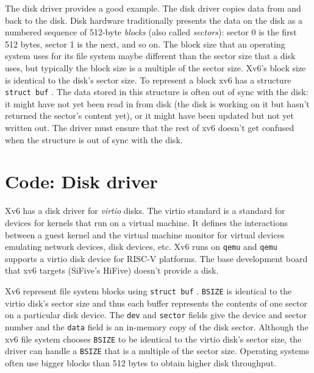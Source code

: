 The disk driver provides a good example.  The disk driver copies data
from and back to the disk.  Disk hardware traditionally presents the data on the
disk as a numbered sequence of 512-byte 
\textit{blocks} 
(also called 
\textit{sectors}): 
sector 0 is the first 512 bytes, sector 1 is the next, and so on. The block size
that an operating system uses for its file system maybe different than the
sector size that a disk uses, but typically the block size is a multiple of the
sector size.  Xv6's block size is identical to the disk's sector size.  To
represent a block xv6 has a structure
\lstinline{struct buf}
.
The
data stored in this structure is often out of sync with the disk: it might have
not yet been read in from disk (the disk is working on it but hasn't returned
the sector's content yet), or it might have been updated but not yet written
out.  The driver must ensure that the rest of xv6 doesn't get confused when the
structure is out of sync with the disk.

\section{Code: Disk driver}

Xv6 has a disk driver for \textit{virtio} disks. The
virtio standard is a standard for devices for kernels that run on a
virtual machine.  It defines the interactions between a guest kernel
and the virtual machine monitor for virtual devices emulating network
devices, disk devices, etc.  Xv6 runs on \texttt{qemu} and
\texttt{qemu} supports a virtio disk device for RISC-V platforms.  The
base development board that xv6 targets (SiFive's HiFive) doesn't
provide a disk.

Xv6 represent file system blocks using
\lstinline{struct buf}
.
\lstinline{BSIZE}
is identical to the virtio disk's sector size and thus
each buffer represents the contents of one sector on a particular
disk device.  The
\lstinline{dev}
and
\lstinline{sector}
fields give the device and sector
number and the
\lstinline{data}
field is an in-memory copy of the disk sector.
Although the xv6 file system chooses
\lstinline{BSIZE}
to be identical to the virtio disk's sector size, the driver can handle
a
\lstinline{BSIZE}
that is a multiple of the sector size. Operating systems often use
bigger blocks than 512 bytes to obtain higher disk throughput.

